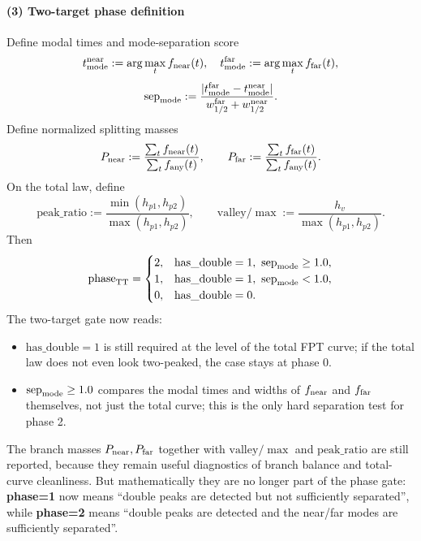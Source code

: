 \documentclass[11pt]{article}
\begin{document}
\paragraph{(3) Two-target phase definition}
Define modal times and mode-separation score
\[
t_{\rm mode}^{\rm near}:=\arg\max_t f_{\rm near}(t),\quad
t_{\rm mode}^{\rm far}:=\arg\max_t f_{\rm far}(t),
\]
\[
\mathrm{sep}_{\rm mode}:=\frac{|t_{\rm mode}^{\rm far}-t_{\rm mode}^{\rm near}|}{w_{1/2}^{\rm far}+w_{1/2}^{\rm near}}.
\]
Define normalized splitting masses
\[
P_{\rm near}:=\frac{\sum_t f_{\rm near}(t)}{\sum_t f_{\rm any}(t)},\qquad
P_{\rm far}:=\frac{\sum_t f_{\rm far}(t)}{\sum_t f_{\rm any}(t)}.
\]
On the total law, define
\[
\mathrm{peak\_ratio}:=\frac{\min(h_{p1},h_{p2})}{\max(h_{p1},h_{p2})},\qquad
\mathrm{valley}/\max:=\frac{h_v}{\max(h_{p1},h_{p2})}.
\]
Then
\[
\mathrm{phase}_{\rm TT}=
\begin{cases}
2,& \mathrm{has\_double}=1,\ \mathrm{sep}_{\rm mode}\ge 1.0,\\
1,& \mathrm{has\_double}=1,\ \mathrm{sep}_{\rm mode}< 1.0,\\
0,& \mathrm{has\_double}=0.
\end{cases}
\]
The two-target gate now reads:
\begin{itemize}
  \item $\mathrm{has\_double}=1$ is still required at the level of the total FPT curve; if the total law does not even look two-peaked, the case stays at phase 0.
  \item $\mathrm{sep}_{\rm mode}\ge 1.0$ compares the modal times and widths of $f_{\rm near}$ and $f_{\rm far}$ themselves, not just the total curve; this is the only hard separation test for phase 2.
\end{itemize}
The branch masses $P_{\rm near},P_{\rm far}$ together with $\mathrm{valley}/\max$ and $\mathrm{peak\_ratio}$ are still reported, because they remain useful diagnostics of branch balance and total-curve cleanliness. But mathematically they are no longer part of the phase gate: \textbf{phase=1} now means ``double peaks are detected but not sufficiently separated'', while \textbf{phase=2} means ``double peaks are detected and the near/far modes are sufficiently separated''.
\end{document}
